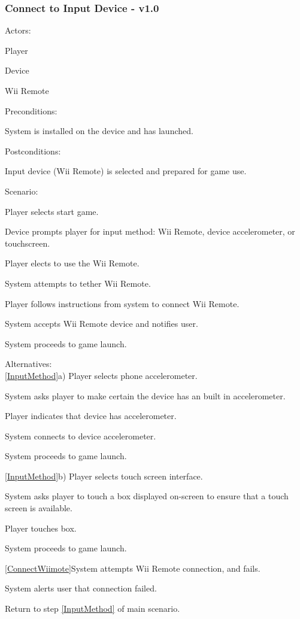 \documentclass[12pt]{article}
\newenvironment{itemize*}%
  {\begin{itemize}%
  	\setlength{\parsep}{0pt}
    \setlength{\itemsep}{0pt}%
    \setlength{\parskip}{0pt}}%
  {\end{itemize}}
\newenvironment{enumerate*}%
  {\begin{enumerate}%
  	\setlength{\parsep}{0pt}
    \setlength{\itemsep}{0pt}%
    \setlength{\parskip}{0pt}}%
  {\end{enumerate}}
\begin{document}
\subsubsection*{Connect to Input Device - v1.0}
Actors:
\begin{itemize*}
\item Player
\item Device 
\item Wii Remote
\end{itemize*}
Preconditions:
\begin{itemize*}
\item System is installed on the device and has launched.
\end{itemize*}
Postconditions:
\begin{itemize*}
\item Input device (Wii Remote) is selected and prepared for game use.
\end{itemize*}
Scenario:
\begin{enumerate*}
\item \label{BeginGame}Player selects start game.
\item \label{InputMethod}Device prompts player for input method: Wii Remote, device accelerometer, or touchscreen.
\item Player elects to use the Wii Remote.
\item \label{ConnectWiimote}System attempts to tether Wii Remote.
\item Player follows instructions from system to connect Wii Remote.
\item System accepts Wii Remote device and notifies user.
\item System proceeds to game launch.
\end{enumerate*}
Alternatives:\\
\ref{InputMethod}a) Player selects phone accelerometer.  
\begin{enumerate*}
\item System asks player to make certain the device has an built in accelerometer.
\item Player indicates that device has accelerometer.
\item System connects to device accelerometer.
\item System proceeds to game launch.
\end{enumerate*}
\ref{InputMethod}b) Player selects touch screen interface.
\begin{enumerate*}
\item System asks player to touch a box displayed on-screen to ensure that a touch screen is available.
\item Player touches box.
\item System proceeds to game launch.
\end{enumerate*}
\ref{ConnectWiimote}System attempts Wii Remote connection, and fails.
\begin{enumerate*}
\item System alerts user that connection failed.
\item Return to step \ref{InputMethod} of main scenario.
\end{enumerate*}
\end{document}
